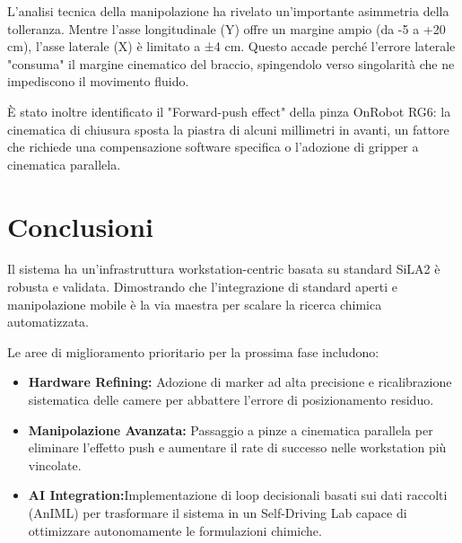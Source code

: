 \documentclass[11pt,a4paper]{article}
\begin{document}
	L'analisi tecnica della manipolazione ha rivelato un'importante asimmetria della tolleranza. Mentre l'asse longitudinale (Y) offre un margine ampio (da -5 a +20 cm), l'asse laterale (X) è limitato a ±4 cm. Questo accade perché l'errore laterale "consuma" il margine cinematico del braccio, spingendolo verso singolarità che ne impediscono il movimento fluido.
	
	 È stato inoltre identificato il "Forward-push effect" della pinza OnRobot RG6: la cinematica di chiusura sposta la piastra di alcuni millimetri in avanti, un fattore che richiede una compensazione software specifica o l'adozione di gripper a cinematica parallela.
	 
	 		
	
	\section{Conclusioni}
	Il sistema ha un'infrastruttura workstation-centric basata su standard SiLA2 è robusta e validata. Dimostrando che l'integrazione di standard aperti e manipolazione mobile è la via maestra per scalare la ricerca chimica automatizzata.
	
	Le aree di miglioramento prioritario per la prossima fase includono:
	\begin{itemize}[]
		\item \textbf{Hardware Refining:} Adozione di marker ad alta precisione e ricalibrazione sistematica delle camere per abbattere l'errore di posizionamento residuo.
		\item \textbf{Manipolazione Avanzata:} Passaggio a pinze a cinematica parallela per eliminare l'effetto push e aumentare il rate di successo nelle workstation più vincolate.
		\item \textbf{AI Integration:}Implementazione di loop decisionali basati sui dati raccolti (AnIML) per trasformare il sistema in un Self-Driving Lab capace di ottimizzare autonomamente le formulazioni chimiche.	
		\end{itemize}

	
\end{document}
